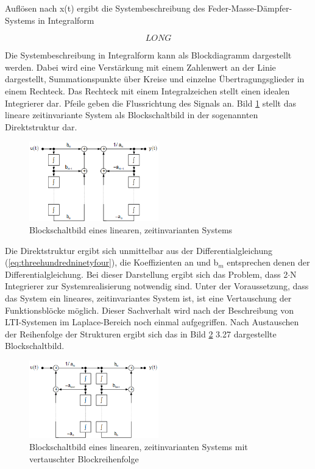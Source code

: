\noindent Auflösen nach x(t) ergibt die Systembeschreibung des Feder-Masse-Dämpfer-Systems in Integralform

\begin{equation}\label{eq:threehundredninetynine}
LONG
\end{equation}\bigskip

\noindent Die Systembeschreibung in Integralform kann als Blockdiagramm dargestellt werden. Dabei wird eine Verstärkung mit einem Zahlenwert an der Linie dargestellt, Summationspunkte über Kreise und einzelne Übertragungsglieder in einem Rechteck. Das Rechteck mit einem Integralzeichen stellt einen idealen Integrierer dar. Pfeile geben die Flussrichtung des Signals an. Bild \ref{fig:ZeitinvarianzBSB} stellt das lineare zeitinvariante System als Blockschaltbild in der sogenannten Direktstruktur dar.

\begin{figure}[H]
  \centerline{\includegraphics[width=0.5\textwidth]{Kapitel2/Bilder/image26}}
  \caption{Blockschaltbild eines linearen, zeitinvarianten Systems}
  \label{fig:ZeitinvarianzBSB}
\end{figure}

\noindent Die Direktstruktur ergibt sich unmittelbar aus der Differentialgleichung (\ref{eq:threehundredninetyfour}), die Koeffizienten an und b$_{m}$ entsprechen denen der Differentialgleichung. Bei dieser Darstellung ergibt sich das Problem, dass 2$\cdot$N Integrierer zur Systemrealisierung notwendig sind. Unter der Voraussetzung, dass das System ein lineares, zeitinvariantes System ist, ist eine Vertauschung der Funktionsblöcke möglich. Dieser
Sachverhalt wird nach der Beschreibung von LTI-Systemen im Laplace-Bereich noch einmal aufgegriffen. Nach Austauschen der Reihenfolge der Strukturen ergibt sich das in Bild \ref{fig:ZeitinvarianzBSBMitTausch} 3.27 dargestellte Blockschaltbild.

\begin{figure}[H]
  \centerline{\includegraphics[width=0.5\textwidth]{Kapitel2/Bilder/image27}}
  \caption{Blockschaltbild eines linearen, zeitinvarianten Systems mit vertauschter Blockreihenfolge}
  \label{fig:ZeitinvarianzBSBMitTausch}
\end{figure}


